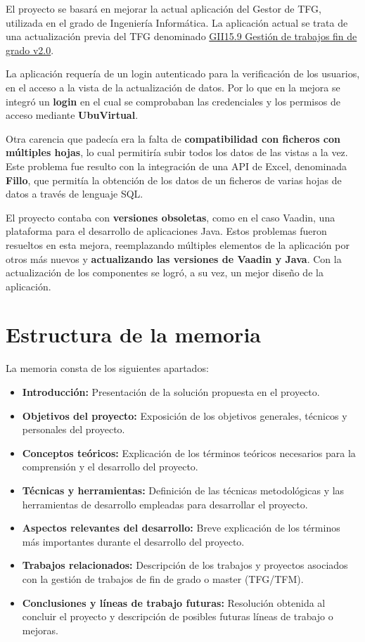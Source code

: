 El proyecto se basará en mejorar la actual aplicación del Gestor de TFG, utilizada en el grado de Ingeniería Informática. La aplicación actual se trata de una actualización previa del TFG denominado \href{https://github.com/jfb0019/Gestor-TFG-2016}{GII15.9 Gestión de trabajos fin de grado v2.0}. 

La aplicación requería de un login autenticado para la verificación de los usuarios, en el acceso a la vista de la actualización de datos. Por lo que en la mejora se integró un \textbf{login} en el cual se comprobaban las credenciales y los permisos de acceso mediante \textbf{UbuVirtual}.

Otra carencia que padecía era la falta de \textbf{compatibilidad con ficheros con múltiples hojas}, lo cual permitiría subir todos los datos de las vistas a la vez. Este problema fue resulto con la integración de una API de Excel, denominada \textbf{Fillo}, que permitía la obtención de los datos de un ficheros de varias hojas de datos a través de lenguaje SQL.

El proyecto contaba con \textbf{versiones obsoletas}, como en el caso Vaadin, una plataforma para el desarrollo de aplicaciones Java. Estos problemas fueron resueltos en esta mejora, reemplazando múltiples elementos de la aplicación por otros más nuevos y \textbf{actualizando las versiones de Vaadin y Java}. Con la actualización de los componentes se logró, a su vez, un mejor diseño de la aplicación.

\section{Estructura de la memoria}
La memoria consta de los siguientes apartados:

\begin{itemize}
	\item \textbf{Introducción:} Presentación de la solución propuesta en el proyecto. 
	\item \textbf{Objetivos del proyecto:}  Exposición de los  objetivos generales, técnicos y personales del proyecto.
	\item \textbf{Conceptos teóricos:} Explicación de los términos teóricos necesarios para la comprensión y el desarrollo del proyecto.
	\item \textbf{Técnicas y herramientas:} Definición de las técnicas metodológicas y las herramientas de desarrollo empleadas para desarrollar el proyecto.
	\item \textbf{Aspectos relevantes del desarrollo:} Breve explicación de los términos más importantes durante el desarrollo del proyecto.
	\item \textbf{Trabajos relacionados:} Descripción de los trabajos y proyectos asociados con la gestión de trabajos de fin de grado o master (TFG/TFM).
	\item \textbf{Conclusiones y líneas de trabajo futuras:} Resolución obtenida al concluir el proyecto y descripción de posibles futuras líneas de trabajo o mejoras.
\end{itemize}